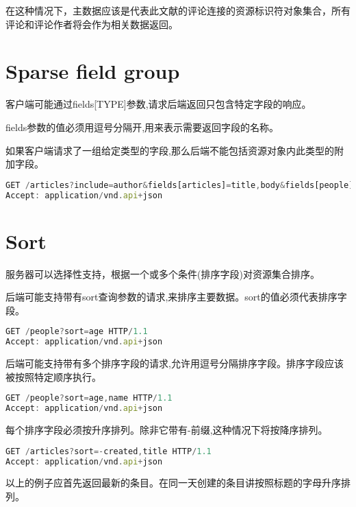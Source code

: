 在这种情况下，主数据应该是代表此文献的评论连接的资源标识符对象集合，所有评论和评论作者将会作为相关数据返回。

\section{Sparse field group}

客户端可能通过fields[TYPE]参数,请求后端返回只包含特定字段的响应。

fields参数的值必须用逗号分隔开,用来表示需要返回字段的名称。

如果客户端请求了一组给定类型的字段,那么后端不能包括资源对象内此类型的附加字段。

\begin{lstlisting}[language=JavaScript]
GET /articles?include=author&fields[articles]=title,body&fields[people]=name HTTP/1.1
Accept: application/vnd.api+json
\end{lstlisting}


\section{Sort}

服务器可以选择性支持，根据一个或多个条件(排序字段)对资源集合排序。

后端可能支持带有sort查询参数的请求,来排序主要数据。sort的值必须代表排序字段。





\begin{lstlisting}[language=JavaScript]
GET /people?sort=age HTTP/1.1
Accept: application/vnd.api+json
\end{lstlisting}


后端可能支持带有多个排序字段的请求,允许用逗号分隔排序字段。排序字段应该被按照特定顺序执行。

\begin{lstlisting}[language=JavaScript]
GET /people?sort=age,name HTTP/1.1
Accept: application/vnd.api+json
\end{lstlisting}

每个排序字段必须按升序排列。除非它带有-前缀,这种情况下将按降序排列。

\begin{lstlisting}[language=JavaScript]
GET /articles?sort=-created,title HTTP/1.1
Accept: application/vnd.api+json
\end{lstlisting}



以上的例子应首先返回最新的条目。在同一天创建的条目讲按照标题的字母升序排列。


